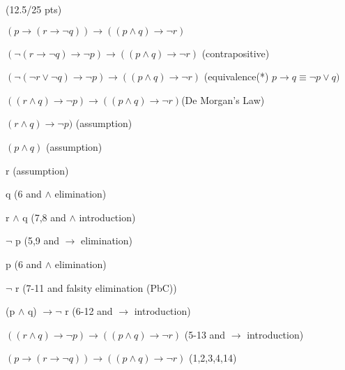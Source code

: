 \documentclass[a4paper,12pt]{article}
\newcommand\tab[1][1cm]{\hspace*{#1}}
\begin{document}
\hfill \small{(12.5/25 pts)}\\
\begin{tcolorbox}
\begin{enumerate}
    \item $(p \rightarrow (r \rightarrow \neg q)) \rightarrow ((p \wedge q) \rightarrow \neg r)$
    \item $( \neg (r \rightarrow \neg q) \rightarrow \neg p ) \rightarrow ((p \wedge q) \rightarrow \neg r)$ \tab (contrapositive)
    \item $( \neg (\neg r \vee \neg q) \rightarrow \neg p ) \rightarrow ((p \wedge q) \rightarrow \neg r)$ \tab (equivalence(*) $p \rightarrow q \equiv \neg p \vee q)$
    \item $((r \wedge q) \rightarrow \neg p ) \rightarrow ((p \wedge q) \rightarrow \neg r)$\tab\tab(De Morgan's Law)
    \begin{tcolorbox}
        \item $(r \wedge q) \rightarrow \neg p )$ \tab (assumption)
        \begin{tcolorbox}
            \item $(p \wedge q)$ \tab (assumption)
            \begin{tcolorbox}
                \item r \tab (assumption)
                \item q \tab (6 and $\wedge$ elimination)
                \item r $\wedge$ q \tab (7,8 and $\wedge$ introduction)
                \item $\neg$ p \tab (5,9 and $\rightarrow$ elimination)
                \item p \tab (6 and $\wedge$ elimination)
            \end{tcolorbox}
            \item $\neg$ r \tab (7-11 and falsity elimination (PbC))
        \end{tcolorbox}
        \item (p $\wedge$ q) $\rightarrow \neg$ r \tab (6-12 and $\rightarrow$ introduction)
    \end{tcolorbox}
    \item $((r \wedge q) \rightarrow \neg p ) \rightarrow ((p \wedge q) \rightarrow \neg r)$ \tab (5-13 and $\rightarrow$ introduction)
    \item $(p \rightarrow (r \rightarrow \neg q)) \rightarrow ((p \wedge q) \rightarrow \neg r)$ \tab (1,2,3,4,14)
\end{enumerate}


\end{tcolorbox}
\end{document}
